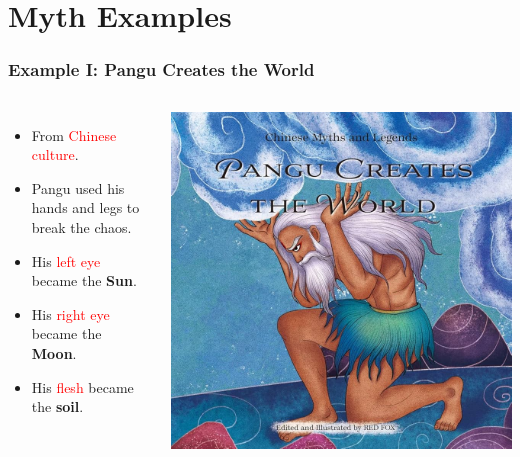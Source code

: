 \documentclass[aspectratio=1611, 9pt]{beamer}
\begin{document}
\section{Myth Examples}
\begin{frame}
  \frametitle{Example I: Pangu Creates the World}
  \begin{columns}
    \begin{itemize}
      \item From \textcolor{red}{Chinese culture}.
      \item Pangu used his hands and legs to break the chaos.
      \item His \textcolor{red}{left eye} became the \textbf{Sun}.
      \item His \textcolor{red}{right eye} became the \textbf{Moon}.
      \item His \textcolor{red}{flesh} became the \textbf{soil}.
    \end{itemize}

    \begin{center}
      \includegraphics[width=1.0\textwidth]{pictures/myth2.jpg}
    \end{center}
  \end{columns}
\end{frame}
\end{document}
